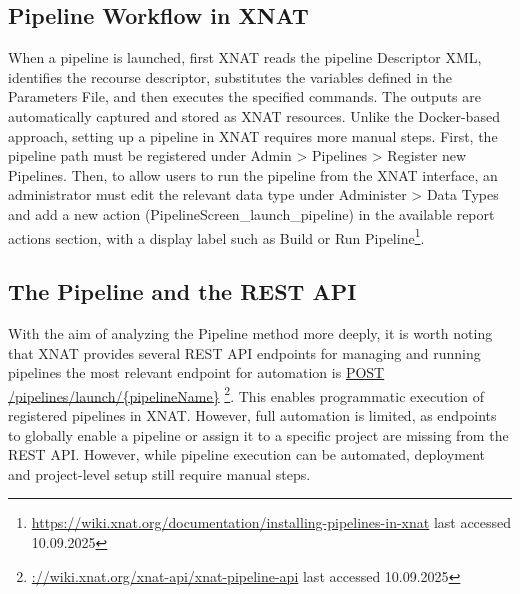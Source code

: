 \subsection{Pipeline Workflow in XNAT}
When a pipeline is launched, first XNAT reads the pipeline Descriptor XML, identifies the recourse descriptor, substitutes the variables defined in the Parameters File, and then executes the specified commands. The outputs are automatically captured and stored as XNAT resources.
Unlike the Docker-based approach, setting up a pipeline in XNAT requires more manual steps. First, the pipeline path must be registered under Admin > Pipelines > Register new Pipelines. Then, to allow users to run the pipeline from the XNAT interface, an administrator must edit the relevant data type under Administer > Data Types and add a new action (PipelineScreen\_launch\_pipeline) in the available report actions section, with a display label such as Build or Run Pipeline\footnote{\url{https://wiki.xnat.org/documentation/installing-pipelines-in-xnat} last accessed 10.09.2025}.
\normalsize



\subsection{The Pipeline and the REST API}
With the aim of analyzing the Pipeline method more deeply, it is worth noting that XNAT provides several REST API endpoints for managing and running pipelines the most relevant endpoint for automation is \url{POST /pipelines/launch/{pipelineName}} \footnote{\url{://wiki.xnat.org/xnat-api/xnat-pipeline-api} last accessed 10.09.2025}.
This enables programmatic execution of registered pipelines in XNAT. However, full automation is limited, as endpoints to globally enable a pipeline or assign it to a specific project are missing from the REST API. However, while pipeline execution can be automated, deployment and project-level setup still require manual steps.


